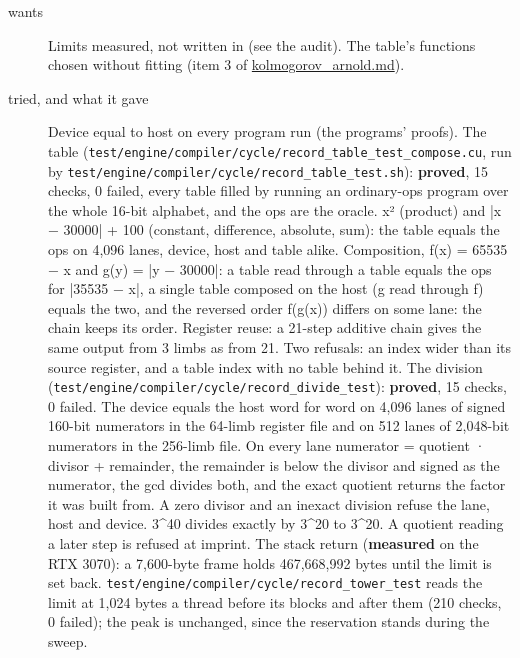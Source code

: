 \begin{description}
\item[{wants}] Limits measured, not written in (see the audit). The table's functions chosen without fitting (item 3 of \hyperref[chap:kolmogorov-arnold]{kolmogorov\_\allowbreak{}arnold.md}).
\item[{tried, and what it gave}] Device equal to host on every program run (the programs' proofs). The table (\texttt{test/\allowbreak{}engine/\allowbreak{}compiler/\allowbreak{}cycle/\allowbreak{}record\_\allowbreak{}table\_\allowbreak{}test\_\allowbreak{}compose.\allowbreak{}cu}, run by \texttt{test/\allowbreak{}engine/\allowbreak{}compiler/\allowbreak{}cycle/\allowbreak{}record\_\allowbreak{}table\_\allowbreak{}test.\allowbreak{}sh}): \textbf{proved}, 15 checks, 0 failed, every table filled by running an ordinary-ops program over the whole 16-bit alphabet, and the ops are the oracle. x² (product) and |x − 30000| + 100 (constant, difference, absolute, sum): the table equals the ops on 4,096 lanes, device, host and table alike. Composition, f(x) = 65535 − x and g(y) = |y − 30000|: a table read through a table equals the ops for |35535 − x|, a single table composed on the host (g read through f) equals the two, and the reversed order f(g(x)) differs on some lane: the chain keeps its order. Register reuse: a 21-step additive chain gives the same output from 3 limbs as from 21. Two refusals: an index wider than its source register, and a table index with no table behind it. The division (\texttt{test/\allowbreak{}engine/\allowbreak{}compiler/\allowbreak{}cycle/\allowbreak{}record\_\allowbreak{}divide\_\allowbreak{}test}): \textbf{proved}, 15 checks, 0 failed. The device equals the host word for word on 4,096 lanes of signed 160-bit numerators in the 64-limb register file and on 512 lanes of 2,048-bit numerators in the 256-limb file. On every lane numerator = quotient · divisor + remainder, the remainder is below the divisor and signed as the numerator, the gcd divides both, and the exact quotient returns the factor it was built from. A zero divisor and an inexact division refuse the lane, host and device. 3\textasciicircum{}40 divides exactly by 3\textasciicircum{}20 to 3\textasciicircum{}20. A quotient reading a later step is refused at imprint. The stack return (\textbf{measured} on the RTX 3070): a 7,600-byte frame holds 467,668,992 bytes until the limit is set back. \texttt{test/\allowbreak{}engine/\allowbreak{}compiler/\allowbreak{}cycle/\allowbreak{}record\_\allowbreak{}tower\_\allowbreak{}test} reads the limit at 1,024 bytes a thread before its blocks and after them (210 checks, 0 failed); the peak is unchanged, since the reservation stands during the sweep.

\end{description}

